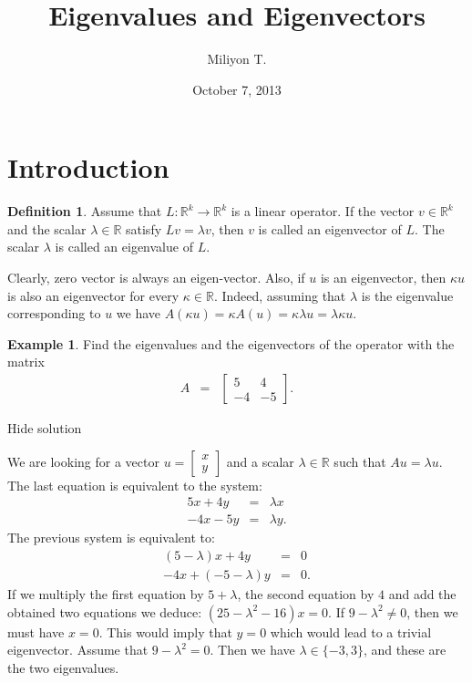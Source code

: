 \documentclass[11pt]{article}
\theoremstyle{definition}
\newtheorem{defn}[thm]{Definition}
\newtheorem{exmp}[thm]{Example}
\theoremstyle{plain}
\begin{document}
\nocite{}

\title{Eigenvalues and Eigenvectors}

\author{Miliyon T.}
\date{October 7, 2013}
\maketitle

\section{Introduction}


\begin{defn}
Assume that \( L:\mathbb R^k\to\mathbb R^k \) is a linear operator. If the vector \( v\in\mathbb R^k \) and the scalar \( \lambda\in\mathbb R \) satisfy \( L v=\lambda v \), then \( v \) is called an eigenvector of \( L \). The scalar \( \lambda \) is called an eigenvalue of \( L \).
\end{defn}

Clearly, zero vector is always an eigen-vector. Also, if \( u \) is an eigenvector, then \( \kappa u \) is also an eigenvector for every \( \kappa\in\mathbb R \). Indeed, assuming that \( \lambda \) is the eigenvalue corresponding to \( u \) we have \( A(\kappa u)=\kappa A(u)=\kappa\lambda u=\lambda \kappa u \).

\begin{exmp}
Find the eigenvalues and the eigenvectors of the operator with the matrix \begin{eqnarray*}A&=&\left[\begin{array}{cc}5&4\\-4&-5\end{array}\right]. \end{eqnarray*}
\end{exmp}

Hide solution

We are looking for a vector \( u=\left[\begin{array}{c}x\\y\end{array}\right]\) and a scalar \( \lambda\in\mathbb R \) such that \( Au=\lambda u \). The last equation is equivalent to the system: \begin{eqnarray*} 5x+4y&=&\lambda x\\ -4x-5y&=&\lambda y. \end{eqnarray*} The previous system is equivalent to: \begin{eqnarray*} (5-\lambda)x+4y&=&0\\ -4x+(-5-\lambda)y&=&0. \end{eqnarray*} If we multiply the first equation by \( 5+\lambda \), the second equation by \( 4 \) and add the obtained two equations we deduce: \( (25-\lambda^2-16)x=0 \). If \( 9-\lambda^2\neq 0 \), then we must have \( x=0 \). This would imply that \( y=0 \) which would lead to a trivial eigenvector. Assume that \( 9-\lambda^2=0 \). Then we have \( \lambda\in\{-3,3\} \), and these are the two eigenvalues.
\end{document}
